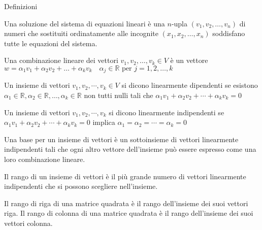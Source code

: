 \documentclass{beamer}
\begin{document}
\begin{frame}[allowframebreaks]{Definizioni}

\begin{definition}[soluzione]
   Una soluzione del sistema di equazioni lineari \`e una
   $n$-upla $(v_1, v_2, \ldots, v_n)$ di numeri che sostituiti
   ordinatamente alle incognite $(x_1, x_2, \ldots, x_n)$
   soddisfano  tutte le equazioni del sistema.
\end{definition}

\begin{definition}
  Una combinazione lineare dei vettori $v_1, v_2, \ldots, v_k \in V$
  \`e un vettore $w = \alpha_1 v_1+ \alpha_2 v_2 +\ldots+ \alpha_k v_k\quad\alpha_j \in \mathbb{R} \text{ per } j = 1, 2, \ldots, k$
\end{definition}

\framebreak

\begin{definition}
  Un insieme di vettori $v_1, v_2, \cdots, v_k \in V$ si  dicono
  linearmente dipendenti se esistono 
  $\alpha_1\in \mathbb{R}, \alpha_2\in \mathbb{R},\ldots, \alpha_k \in \mathbb{R}$
  non tutti nulli tali che
  $\alpha_1 v_1+ \alpha_2 v_2 +\cdots+ \alpha_k v_k = 0 $
\end{definition}

\begin{definition}
  Un insieme di vettori $v_1, v_2, \cdots, v_k$ si dicono linearmente indipendenti se 
  $\alpha_1 v_1+ \alpha_2 v_2 +\cdots+ \alpha_k v_k = 0$ implica
  $\alpha_1 = \alpha_2 = \cdots = \alpha_k = 0$
\end{definition}

\begin{definition}[base]
  Una base per un insieme di vettori \`e un sottoinsieme di vettori linearmente indipendenti tali che ogni altro vettore dell'insieme può essere espresso come una loro combinazione lineare.
\end{definition}

\begin{definition}[rango]
  Il rango di un insieme di vettori \`e il più grande numero di vettori linearmente indipendenti che si possono scegliere nell'insieme.

  Il rango di riga di una matrice quadrata \`e il rango dell'insieme dei suoi vettori riga. Il rango di colonna di una matrice quadrata \`e il rango dell'insieme dei suoi vettori colonna. 


\end{definition}
\end{frame}
\end{document}
